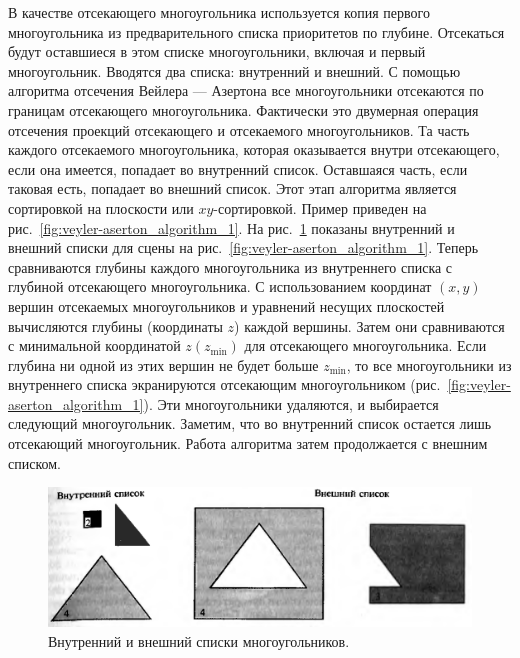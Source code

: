 В качестве отсекающего многоугольника используется копия первого многоугольника из предварительного списка приоритетов по глубине. Отсекаться будут оставшиеся в этом списке многоугольники, включая и первый многоугольник. Вводятся два списка: внутренний и внешний. С помощью алгоритма отсечения Вейлера — Азертона все многоугольники отсекаются по границам отсекающего многоугольника. Фактически это двумерная операция отсечения проекций отсекающего и отсекаемого многоугольников. Та часть каждого отсекаемого многоугольника, которая оказывается внутри отсекающего, если она имеется, попадает во внутренний список. Оставшаяся часть, если таковая есть, попадает во внешний список. Этот этап алгоритма является сортировкой на плоскости или \(xy\)-сортировкой. Пример приведен на рис.~\ref{fig:veyler-aserton_algorithm_1}. На рис.~\ref{fig:veyler-aserton_algorithm_2} показаны внутренний и внешний списки для сцены на рис.~\ref{fig:veyler-aserton_algorithm_1}. Теперь сравниваются глубины каждого многоугольника из внутреннего списка с глубиной отсекающего многоугольника. С использованием координат \((x, y)\) вершин отсекаемых многоугольников и уравнений несущих плоскостей вычисляются глубины (координаты \(z\)) каждой вершины. Затем они сравниваются с минимальной координатой \(z(z_{\text{min}})\) для отсекающего многоугольника. Если глубина ни одной из этих вершин не будет больше \(z_{\text{min}}\), то все многоугольники из внутреннего списка экранируются отсекающим многоугольником (рис.~\ref{fig:veyler-aserton_algorithm_1}). Эти многоугольники удаляются, и выбирается следующий многоугольник. Заметим, что во внутренний список остается лишь отсекающий многоугольник. Работа алгоритма затем продолжается с внешним списком.

\begin{figure}[H]
    \centering
    \includegraphics[width=\textwidth]{img/veyler-aserton_algorithm_2.png}
    \caption{Внутренний и внешний списки многоугольников.}
    \label{fig:veyler-aserton_algorithm_2}
\end{figure}

